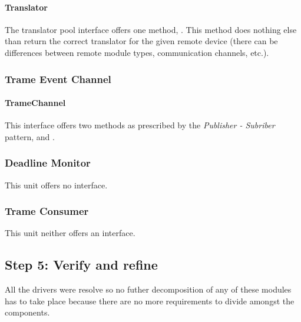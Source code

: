 \paragraph{Translator}

\npar The translator pool interface offers one method,
. This method does nothing else than
return the correct translator for the given remote device (there can be
differences between remote module types, communication channels, etc.).

\subsubsection{Trame Event Channel}

\paragraph{TrameChannel}

\npar This interface offers two methods as prescribed by the \emph{Publisher -
Subriber} pattern,  and .

\subsubsection{Deadline Monitor}

\npar This unit offers no interface. 

\subsubsection{Trame Consumer}

\npar This unit neither offers an interface.


\subsection{Step 5: Verify and refine}
\label{add:it2/verification}

\npar All the drivers were resolve so no futher decomposition of any of these
modules has to take place because there are no more requirements to divide
amongst the components. 
